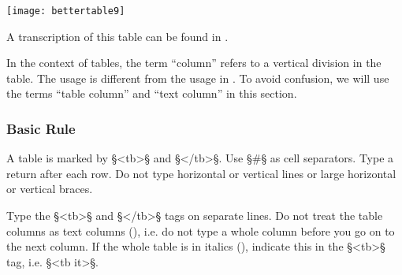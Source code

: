 \texttt{[image: bettertable9]}

\begin{crossref}
A transcription of this table can be found in .
\end{crossref}

\vspace{3mm}
\begin{note}
In the context of tables, the term “column” refers to a vertical division in the table. The usage is different from the usage in . To avoid confusion, we will use the terms “table column” and “text column” in this section.
\end{note}

\subsubsection{Basic Rule}
\label{section tables basic rule}

\begin{mainrule}
A table is marked by §<tb>§ and §</tb>§. Use §#§ as cell separators. Type a return after each row. Do not type horizontal or vertical lines or large horizontal or vertical braces.
\end{mainrule}

\begin{clarification}
Type the §<tb>§ and §</tb>§ tags on separate lines. Do not treat the table columns as text columns (), i.e. do not type a whole column before you go on to the next column. If the whole table is in italics (), indicate this in the §<tb>§ tag, i.e. §<tb it>§.
\end{clarification}

